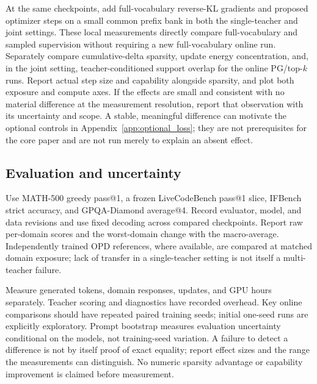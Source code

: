 At the same checkpoints, add full-vocabulary reverse-KL gradients and
proposed optimizer steps on a small common prefix bank in both the
single-teacher and joint settings. These local measurements directly
compare full-vocabulary and sampled supervision without requiring a
new full-vocabulary online run. Separately compare cumulative-delta
sparsity, update energy concentration, and, in the joint setting,
teacher-conditioned support overlap for the online PG/top-$k$ runs. Report actual step size and capability alongside
sparsity, and plot both exposure and compute axes. If the effects are
small and consistent with no material difference at the measurement
resolution, report that observation with its uncertainty and scope.
A stable, meaningful difference can motivate the optional controls in
Appendix~\ref{app:optional_loss}; they are not prerequisites for the
core paper and are not run merely to explain an absent effect.

\subsection{Evaluation and uncertainty}

Use MATH-500 greedy pass@1, a frozen LiveCodeBench pass@1 slice,
IFBench strict accuracy, and GPQA-Diamond average@4. Record evaluator,
model, and data revisions and use fixed decoding across compared
checkpoints. Report raw per-domain scores and the worst-domain change
with the macro-average. Independently trained OPD references, where
available, are compared at matched domain exposure; lack of transfer
in a single-teacher setting is not itself a multi-teacher failure.

Measure generated tokens, domain responses, updates, and GPU hours
separately. Teacher scoring and diagnostics have recorded overhead.
Key online comparisons should have repeated paired training seeds;
initial one-seed runs are explicitly exploratory. Prompt bootstrap
measures evaluation uncertainty conditional on the models, not
training-seed variation. A failure to detect a difference is not by
itself proof of exact equality; report effect sizes and the range the
measurements can distinguish. No numeric sparsity advantage or
capability improvement is claimed before measurement.

